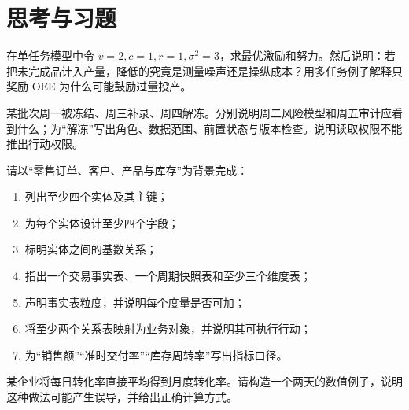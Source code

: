 
\section*{思考与习题}

\begin{exercise}[激励与指标完整性]
在单任务模型中令 \(v=2,c=1,r=1,\sigma^2=3\)，求最优激励和努力。然后说明：若把未完成品计入产量，降低的究竟是测量噪声还是操纵成本？用多任务例子解释只奖励 OEE 为什么可能鼓励过量投产。
\end{exercise}
\begin{exercise}[双时间与权限]
某批次周一被冻结、周三补录、周四解冻。分别说明周二风险模型和周五审计应看到什么；为“解冻”写出角色、数据范围、前置状态与版本检查。说明读取权限不能推出行动权限。
\end{exercise}

\begin{exercise}
请以“零售订单、客户、产品与库存”为背景完成：
\begin{enumerate}
  \item 列出至少四个实体及其主键；
  \item 为每个实体设计至少四个字段；
  \item 标明实体之间的基数关系；
  \item 指出一个交易事实表、一个周期快照表和至少三个维度表；
  \item 声明事实表粒度，并说明每个度量是否可加；
  \item 将至少两个关系表映射为业务对象，并说明其可执行行动；
  \item 为“销售额”“准时交付率”“库存周转率”写出指标口径。
\end{enumerate}
\end{exercise}

\begin{exercise}
某企业将每日转化率直接平均得到月度转化率。请构造一个两天的数值例子，说明这种做法可能产生误导，并给出正确计算方式。
\end{exercise}

